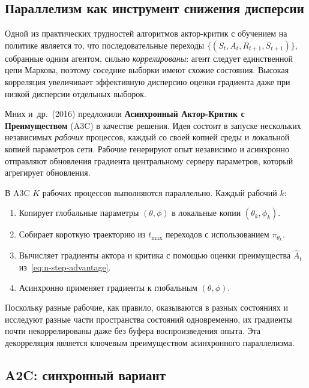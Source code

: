 \subsection{Параллелизм как инструмент снижения дисперсии}

Одной из практических трудностей алгоритмов актор-критик с обучением на политике является то, что последовательные переходы $\{(S_t, A_t, R_{t+1}, S_{t+1})\}$, собранные одним агентом, сильно \emph{коррелированы}: агент следует единственной цепи Маркова, поэтому соседние выборки имеют схожие состояния. Высокая корреляция увеличивает эффективную дисперсию оценки градиента даже при низкой дисперсии отдельных выборок.

Мних и~др.~(2016) предложили \textbf{Асинхронный Актор-Критик с Преимуществом} (A3C) в качестве решения. Идея состоит в запуске нескольких независимых \emph{рабочих} процессов, каждый со своей копией среды и локальной копией параметров сети. Рабочие генерируют опыт независимо и асинхронно отправляют обновления градиента центральному серверу параметров, который агрегирует обновления.

\begin{definition}[Архитектура A3C]
\label{def:a3c}
В A3C $K$ рабочих процессов выполняются параллельно. Каждый рабочий $k$:
\begin{enumerate}[label=\arabic*., leftmargin=*]
  \item Копирует глобальные параметры $(\theta, \phi)$ в локальные копии $(\theta_k, \phi_k)$.
  \item Собирает короткую траекторию из $t_\mathrm{max}$ переходов с использованием $\pi_{\theta_k}$.
  \item Вычисляет градиенты актора и критика с помощью оценки преимущества $\hat{A}_t$ из~\eqref{eq:n-step-advantage}.
  \item Асинхронно применяет градиенты к глобальным $(\theta, \phi)$.
\end{enumerate}
\end{definition}

Поскольку разные рабочие, как правило, оказываются в разных состояниях и исследуют разные части пространства состояний одновременно, их градиенты почти некоррелированы даже без буфера воспроизведения опыта. Эта декорреляция является ключевым преимуществом асинхронного параллелизма.

\subsection{A2C: синхронный вариант}

